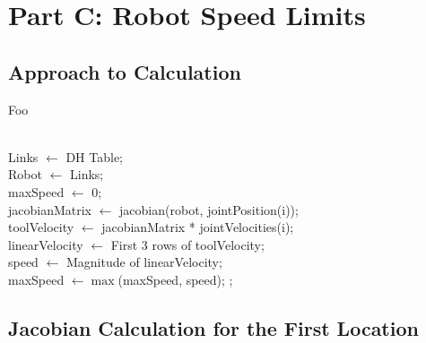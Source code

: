 \section{Part C: Robot Speed Limits}
\subsection{Approach to Calculation}
Foo
\\
\\
\begin{algorithm}[H]
    Links $\gets$ DH Table; \\
    Robot $\gets$ Links; \\
    maxSpeed $\gets$ 0; \\
    {
        jacobianMatrix $\gets$ jacobian(robot, jointPosition(i));\\
        toolVelocity $\gets$ jacobianMatrix * jointVelocities(i);\\
        linearVelocity $\gets$ First 3 rows of toolVelocity; \\
        speed $\gets$ Magnitude of linearVelocity; \\
        maxSpeed $\gets \max$(maxSpeed, speed);
    }
    ;
\end{algorithm}
\subsection{Jacobian Calculation for the First Location}

